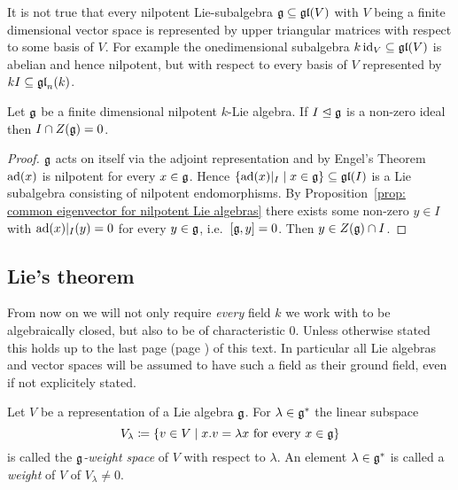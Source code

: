 \begin{rem}
 It is not true that every nilpotent Lie-subalgebra $\mathfrak{g} \subseteq \mathfrak{gl}(V)$ with $V$ being a finite dimensional vector space is represented by upper triangular matrices with respect to some basis of $V$. For example the onedimensional subalgebra $k \operatorname{id}_V \subseteq \mathfrak{gl}(V)$ is abelian and hence nilpotent, but with respect to every basis of $V$ represented by $kI \subseteq \mathfrak{gl}_n(k)$.
\end{rem}




\begin{cor}\label{cor: ideal in nilpotent has nontrivial intersection with center}
 Let $\mathfrak{g}$ be a finite dimensional nilpotent $k$-Lie algebra. If $I \trianglelefteq \mathfrak{g}$ is a non-zero ideal then $I \cap Z(\mathfrak{g}) = 0$.
\end{cor}
\begin{proof}
 $\mathfrak{g}$ acts on itself via the adjoint representation and by Engel’s Theorem $\operatorname{ad}(x)$ is nilpotent for every $x \in \mathfrak{g}$. Hence $\{\operatorname{ad}(x)|_I \mid x \in \mathfrak{g}\} \subseteq \mathfrak{gl}(I)$ is a Lie subalgebra consisting of nilpotent endomorphisms. By Proposition~\ref{prop: common eigenvector for nilpotent Lie algebras} there exists some non-zero $y \in I$ with $\operatorname{ad}(x)|_I(y) = 0$ for every $y \in \mathfrak{g}$, i.e.\ $[\mathfrak{g}, y] = 0$. Then $y \in Z(\mathfrak{g}) \cap I$.
\end{proof}





\subsection{Lie’s theorem}


From now on we will not only require \emph{every} field $k$ we work with to be algebraically closed, but also to be of characteristic $0$. Unless otherwise stated this holds up to the last page (page \pageref{LastPage}) of this text. In particular all Lie algebras and vector spaces will be assumed to have such a field as their ground field, even if not explicitely stated.


\begin{defi}
 Let $V$ be a representation of a Lie algebra $\mathfrak{g}$. For $\lambda \in \mathfrak{g}^*$ the linear subspace
 \[
  V_\lambda \coloneqq \{v \in V \mid \text{$x.v = \lambda x$ for every $x \in \mathfrak{g}$}\}
 \]
 is called the \emph{$\mathfrak{g}$-weight space} of $V$ with respect to $\lambda$. An element $\lambda \in \mathfrak{g}^*$ is called a \emph{weight} of $V$ of $V_\lambda \neq 0$.
\end{defi}


